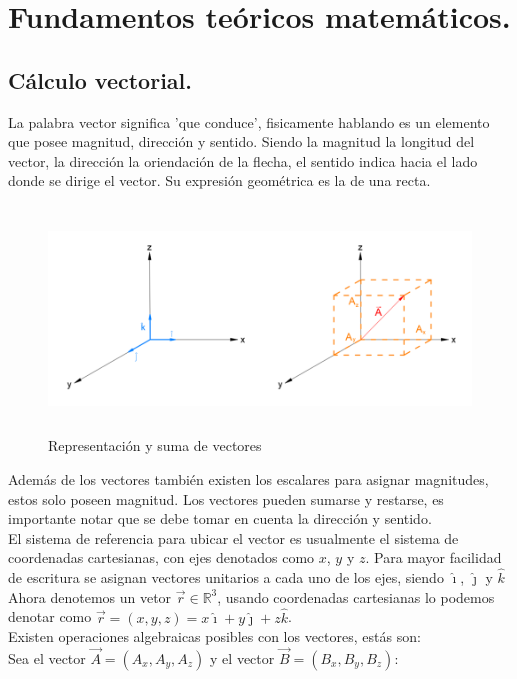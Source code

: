 \chapter{Fundamentos teóricos matemáticos.}
\section{Cálculo vectorial.}\label{sec:Calculo vectorial.}
\setcounter{equation}{0}
\setcounter{figure}{0}

La palabra vector significa 'que conduce', fisicamente hablando es un elemento que posee magnitud, dirección y sentido. Siendo la magnitud la longitud del vector, la dirección la oriendación de la flecha, el sentido indica hacia el lado donde se dirige el vector.  Su expresión geométrica es la de una recta.
\begin{figure}[H]
\centering
\includegraphics[height=6cm]{Imagenes/vectoreuni.png}
\caption{Representación y suma de vectores}\label{fig:Representacion vectores}
\end{figure}
Además de los vectores también existen los escalares para asignar magnitudes, estos solo poseen magnitud. Los vectores pueden sumarse y restarse, es importante notar que se debe tomar en cuenta la dirección y sentido.\\
El sistema de referencia para ubicar el vector es usualmente el sistema de coordenadas cartesianas, con ejes denotados como $x$, $y$ y $z$. Para mayor facilidad de escritura se asignan vectores unitarios a cada uno de los ejes, siendo $\hat{\imath}$, $\hat{\jmath}$ y $\hat{k}$\\
Ahora denotemos un vetor $\vec{r}\in \mathbb{R}^3$, usando coordenadas cartesianas lo podemos denotar como $\vec{r}=(x,y,z)=x\hat{\imath}+y\hat{\jmath}+z\hat{k}$.\\
Existen operaciones algebraicas posibles con los vectores, estás son:\\
Sea el vector $\vec{A}=(A_x,A_y,A_z)$ y el vector $\vec{B}=(B_x,B_y,B_z)$:
